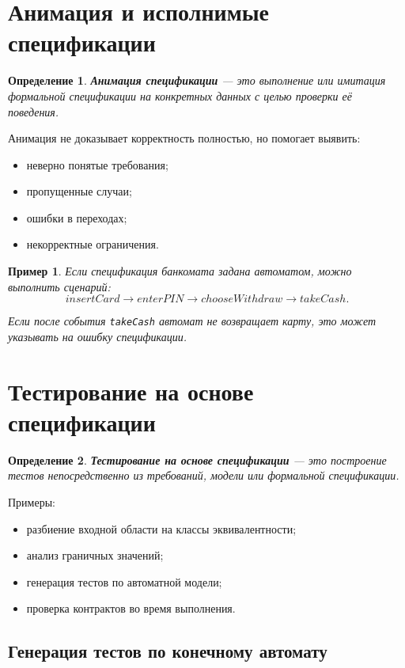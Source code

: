 \documentclass[12pt,a4paper]{article}
\newtheorem{definition}{Определение}
\newtheorem{example}{Пример}
\begin{document}
\section{Анимация и исполнимые спецификации}

\begin{definition}
\textbf{Анимация спецификации} --- это выполнение или имитация формальной спецификации на конкретных данных с целью проверки её поведения.
\end{definition}

Анимация не доказывает корректность полностью, но помогает выявить:
\begin{itemize}
    \item неверно понятые требования;
    \item пропущенные случаи;
    \item ошибки в переходах;
    \item некорректные ограничения.
\end{itemize}

\begin{example}
Если спецификация банкомата задана автоматом, можно выполнить сценарий:
\[
    insertCard \to enterPIN \to chooseWithdraw \to takeCash.
\]

Если после события \texttt{takeCash} автомат не возвращает карту, это может указывать на ошибку спецификации.
\end{example}

\section{Тестирование на основе спецификации}

\begin{definition}
\textbf{Тестирование на основе спецификации} --- это построение тестов непосредственно из требований, модели или формальной спецификации.
\end{definition}

Примеры:
\begin{itemize}
    \item разбиение входной области на классы эквивалентности;
    \item анализ граничных значений;
    \item генерация тестов по автоматной модели;
    \item проверка контрактов во время выполнения.
\end{itemize}

\subsection{Генерация тестов по конечному автомату}
\end{document}
